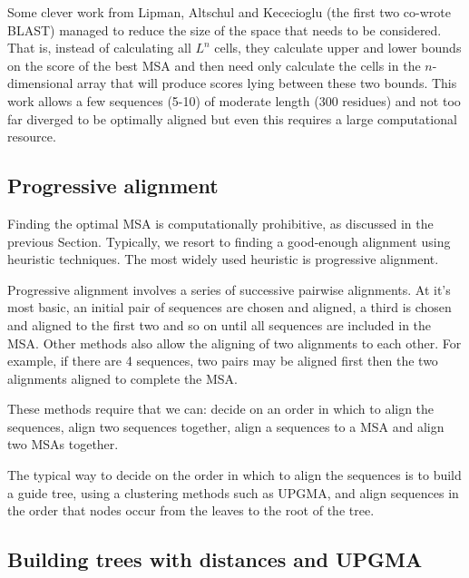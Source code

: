 \documentclass[11pt]{article}
\begin{document}
Some clever work from Lipman, Altschul and Kececioglu (the first two co-wrote BLAST) managed to reduce the size of the space that needs to be considered.  That is, instead of calculating all $L^n$ cells, they calculate upper and lower bounds on the score of the best MSA and then need only calculate the cells in the $n$-dimensional array that will produce scores lying between these two bounds.   This work allows a few sequences (5-10) of moderate length (300 residues) and not too far diverged to be optimally aligned but even this requires a large computational resource.


\subsection{Progressive alignment}

Finding the optimal MSA is computationally  prohibitive, as discussed in the previous Section.  Typically, we resort to finding a good-enough alignment using heuristic techniques.  The most widely used heuristic is progressive alignment.  

Progressive alignment involves a series of successive pairwise alignments.  At it's most basic, an initial pair of sequences are chosen and aligned, a third is chosen and aligned to the first two and so on until all sequences are included in the MSA.  Other methods also allow the aligning of two alignments to each other.  For example, if there are 4 sequences, two pairs may be aligned first then the two alignments aligned to complete the MSA. 

These methods require that we can: decide on an order in which to align the sequences, align two sequences together, align a sequences to a MSA and align two MSAs together.  

The typical way to decide on the order in which to align the sequences is to build a guide tree, using a clustering methods such as UPGMA, and align sequences in the order that nodes occur from the leaves to the root of the tree. 
  
\subsection{Building trees with distances and UPGMA} \label{sec:UPGMA}

\end{document}
